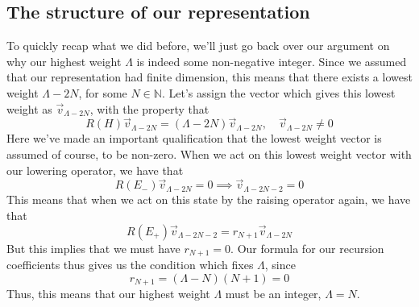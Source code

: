 \subsection{The structure of our representation} 
To quickly recap what we did before, we'll just 
go back over our argument on why our highest 
weight $ \Lambda $ is indeed some non-negative integer.
Since we assumed that our representation 
had finite dimension, this means that there exists 
a lowest weight $ \Lambda  - 2N $, 
for some  $ N \in \mathbb{N } $. 
Let's assign the vector which gives this lowest weight 
as $ \vec{v}_{ \Lambda  - 2N }$, with 
the property that 
\[
	R ( H ) \vec{v}_{ \Lambda - 2N } = ( \Lambda  - 2N ) \vec{v}_{ \Lambda - 2N }, 
	\quad \vec{v} _{\Lambda - 2N } \neq 0 
\] Here we've made an important 
qualification that the lowest weight vector 
is assumed of course, to be non-zero. When we act on this lowest 
weight vector with our lowering operator, 
we have that 
\[
	R ( E_{ - } ) \vec{v}_{ \Lambda - 2N }  =0 \implies \vec{v}_{ \Lambda - 2N - 2 } = 0 
\] This means that when we act on this state by the raising
operator again, we have that 
\[
 R( E_ + ) \vec{v}_{ \Lambda- 2 N -2 } = r_{ N + 1 } \vec{v}_{ \Lambda - 2N }
\] But this implies that we must have 
$ r _{ N  + 1 }  = 0 $. 
Our formula for our recursion coefficients thus
gives us the condition which fixes $ \Lambda $, since
 \[
	 r_{ N + 1 } = ( \Lambda - N ) ( N + 1 ) = 0 
\] Thus, this means that our highest weight 
$\Lambda $ must be an integer, $ \Lambda = N $. 

